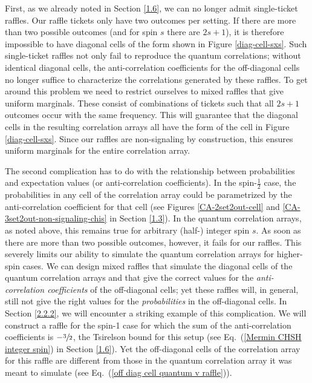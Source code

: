 First, as we already noted in Section \ref{1.6}, we can no longer admit single-ticket raffles. Our raffle tickets only have two outcomes per setting. If there are more than two possible outcomes (and for spin $s$ there are $2s+1$), it is therefore impossible to have diagonal cells of the form shown in Figure \ref{diag-cell-sxs}. Such single-ticket raffles not only fail to reproduce the quantum correlations; without identical diagonal cells, the anti-correlation coefficients for the off-diagonal cells no longer suffice to characterize the correlations generated by these raffles. To get around this problem we need to restrict ourselves to mixed raffles that give uniform marginals. These consist of combinations of tickets such that all $2s+1$ outcomes occur with the same frequency. This will guarantee that the diagonal cells in the resulting correlation arrays all have the form of the cell in Figure \ref{diag-cell-sxs}. Since our raffles are non-signaling by construction, this ensures uniform marginals for the entire correlation array.   

The second complication has to do with the relationship between probabilities and expectation values (or anti-correlation coefficients). In the spin-$\frac12$ case, the probabilities 
in any cell of the correlation array could be parametrized by the anti-correlation coefficient for that cell (see Figures \ref{CA-2set2out-cell} and \ref{CA-3set2out-non-signaling-chis} in Section \ref{1.3}). In the quantum correlation arrays, as noted above, this remains true for arbitrary (half-) integer spin $s$. As soon as there are more than two possible outcomes, however, it fails for our raffles. This severely limits our ability to simulate the quantum correlation arrays for higher-spin cases. We can design mixed raffles that simulate the diagonal cells of the quantum correlation arrays and that give the correct values for the \emph{anti-correlation coefficients} of the off-diagonal cells; yet these raffles will, in general, still not give the right values for the \emph{probabilities} in the off-diagonal cells. In Section \ref{2.2.2}, we will encounter a striking example of this complication. We will construct a raffle for the spin-1 case for which the sum of the anti-correlation coefficients is $-\sfrac32$, the Tsirelson bound for this setup (see Eq.\ (\ref{Mermin CHSH integer spin}) in Section \ref{1.6}). Yet the off-diagonal cells of the correlation array for this raffle are different from those in the quantum correlation array it was meant to simulate (see Eq.\ (\ref{off diag cell quantum v raffle})). 

